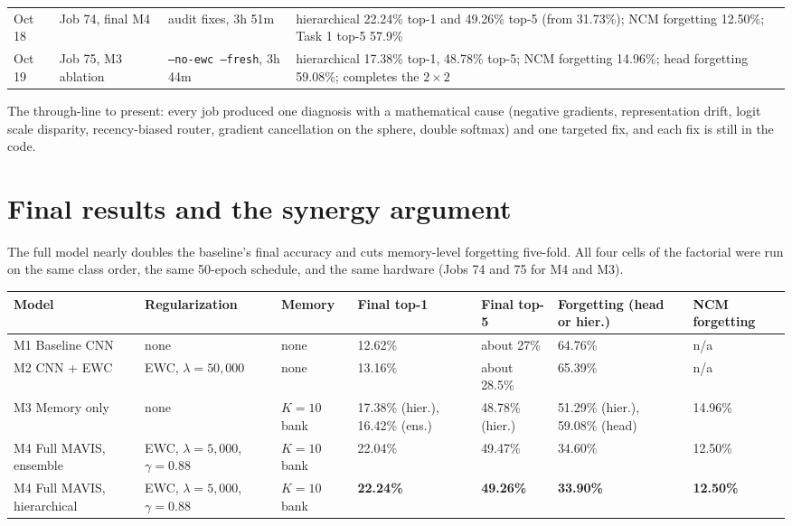 \documentclass[11pt,a4paper]{article}
\newcommand{\code}[1]{\texttt{#1}}
\begin{document}
\begin{longtable}{L{1.5cm} L{2.2cm} L{6.2cm} L{5.1cm}}
Oct 18 & Job 74, final M4 & audit fixes, 3h 51m & hierarchical 22.24\% top-1 and 49.26\% top-5 (from 31.73\%); NCM forgetting 12.50\%; Task 1 top-5 57.9\% \\
Oct 19 & Job 75, M3 ablation & \code{--no-ewc --fresh}, 3h 44m & hierarchical 17.38\% top-1, 48.78\% top-5; NCM forgetting 14.96\%; head forgetting 59.08\%; completes the $2 \times 2$ \\
\end{longtable}

The through-line to present: every job produced one diagnosis with a mathematical cause (negative gradients, representation drift, logit scale disparity, recency-biased router, gradient cancellation on the sphere, double softmax) and one targeted fix, and each fix is still in the code.

\section{Final results and the synergy argument}

The full model nearly doubles the baseline's final accuracy and cuts memory-level forgetting five-fold. All four cells of the factorial were run on the same class order, the same 50-epoch schedule, and the same hardware (Jobs 74 and 75 for M4 and M3).

\begin{tabularx}{\textwidth}{L{2.4cm} Y L{1.5cm} L{2.3cm} L{1.8cm} Y L{1.5cm}}
\toprule
Model & Regularization & Memory & Final top-1 & Final top-5 & Forgetting (head or hier.) & NCM forgetting \\
\midrule
M1 Baseline CNN & none & none & 12.62\% & about 27\% & 64.76\% & n/a \\
M2 CNN + EWC & EWC, $\lambda = 50{,}000$ & none & 13.16\% & about 28.5\% & 65.39\% & n/a \\
M3 Memory only & none & $K{=}10$ bank & 17.38\% (hier.), 16.42\% (ens.) & 48.78\% (hier.) & 51.29\% (hier.), 59.08\% (head) & 14.96\% \\
M4 Full MAVIS, ensemble & EWC, $\lambda = 5{,}000$, $\gamma = 0.88$ & $K{=}10$ bank & 22.04\% & 49.47\% & 34.60\% & 12.50\% \\
M4 Full MAVIS, hierarchical & EWC, $\lambda = 5{,}000$, $\gamma = 0.88$ & $K{=}10$ bank & \textbf{22.24\%} & \textbf{49.26\%} & \textbf{33.90\%} & \textbf{12.50\%} \\
\bottomrule
\end{tabularx}
\end{document}
